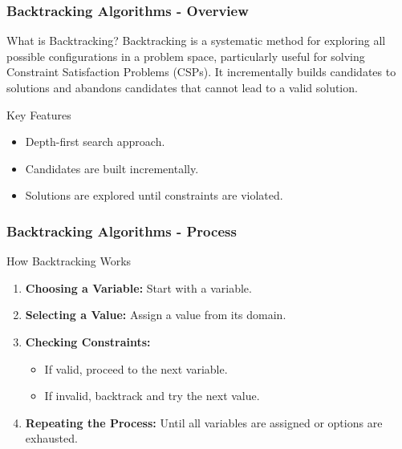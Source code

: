 \documentclass[aspectratio=169]{beamer}
\begin{document}
\begin{frame}[fragile]
    \frametitle{Backtracking Algorithms - Overview}
    \begin{block}{What is Backtracking?}
        Backtracking is a systematic method for exploring all possible configurations in a problem space, 
        particularly useful for solving Constraint Satisfaction Problems (CSPs). 
        It incrementally builds candidates to solutions and abandons candidates that cannot lead to a valid solution.
    \end{block}

    \begin{block}{Key Features}
        \begin{itemize}
            \item Depth-first search approach.
            \item Candidates are built incrementally.
            \item Solutions are explored until constraints are violated.
        \end{itemize}
    \end{block}
\end{frame}

\begin{frame}[fragile]
    \frametitle{Backtracking Algorithms - Process}
    \begin{block}{How Backtracking Works}
        \begin{enumerate}
            \item \textbf{Choosing a Variable:} Start with a variable.
            \item \textbf{Selecting a Value:} Assign a value from its domain.
            \item \textbf{Checking Constraints:}
                \begin{itemize}
                    \item If valid, proceed to the next variable.
                    \item If invalid, backtrack and try the next value.
                \end{itemize}
            \item \textbf{Repeating the Process:} Until all variables are assigned or options are exhausted.
        \end{enumerate}
    \end{block}
\end{frame}
\end{document}
